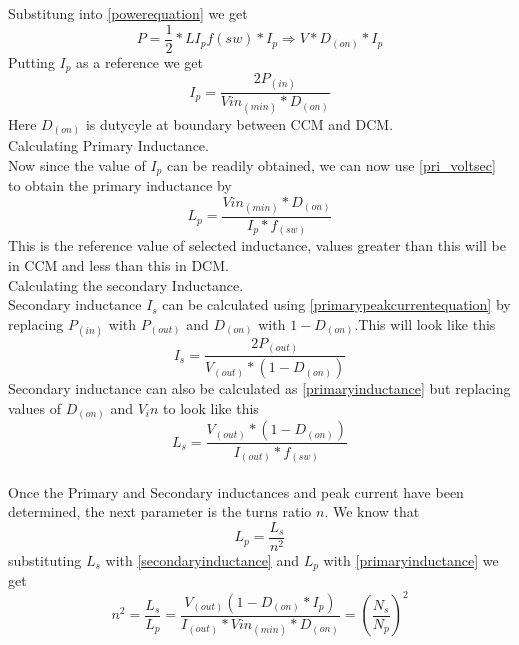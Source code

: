 \documentclass{article}
\begin{document}
Substitung into \ref{powerequation} we get \begin{equation} \label{niceequation}
    P = \frac{1}{2} * LI_pf(sw) * I_p \Longrightarrow V*D_(on)*I_p
\end{equation}
Putting $I_p$ as a reference we get \begin{equation} \label{primarypeakcurrentequation}
    I_p = \frac{2P_(in)}{Vin_(min)*D_(on)}
\end{equation}
Here $D_(on) $ is dutycyle at boundary between CCM and DCM.
\\
Calculating Primary Inductance.
\\
Now since the value of $I_p$ can be readily obtained, we can now use \ref{pri_voltsec} to obtain the primary inductance by \begin{equation}\label{primaryinductance}
    L_p = \frac{Vin_(min) * D_(on)}{I_p * f_(sw)}
\end{equation}
This is the reference value of selected inductance, values greater than this will be in CCM and less than this in DCM.
\\
Calculating the secondary Inductance.
\\
Secondary inductance $I_s$ can be calculated using \ref{primarypeakcurrentequation} by replacing $P_(in)$ with $P_(out)$ and $D_(on)$ with $1-D_(on)$.This will look like this \begin{equation} \label{peaksecondarycurrent}
    I_s = \frac{2P_(out)}{V_(out) * (1-D_(on))}
\end{equation}
Secondary inductance can also be calculated as \ref{primaryinductance} but replacing values of $D_(on)$ and $V_in$ to look like this \begin{equation} \label{secondaryinductance}
    L_s = \frac{V_(out) * (1-D_(on))}{I_(out) * f_(sw)}
\end{equation}
\\
Once the Primary and Secondary inductances and peak current have been determined, the next parameter is the turns ratio $n$.
We know that \begin{equation} \label{lslpeq}
    L_p = \frac{L_s}{n^2}
\end{equation}
substituting $L_s$ with \ref{secondaryinductance} and $L_p$ with \ref{primaryinductance} we get \begin{equation}
    n^2 = \frac{L_s}{L_p} = \frac{V_(out) (1-D_(on) * I_p)}{I_(out) * Vin_(min) * D_(on)} = \left(\frac{N_s}{N_p}\right)^2
\end{equation}
\\
\end{document}
